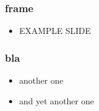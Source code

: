 \begin{frame}
\frametitle{frame}
\begin{itemize}
  \item EXAMPLE SLIDE
\end{itemize}
\end{frame}



\begin{frame}

\frametitle{bla}
\begin{itemize}
  \item<1-> another one
  \item<2-> and yet another one
\end{itemize}
\end{frame}

